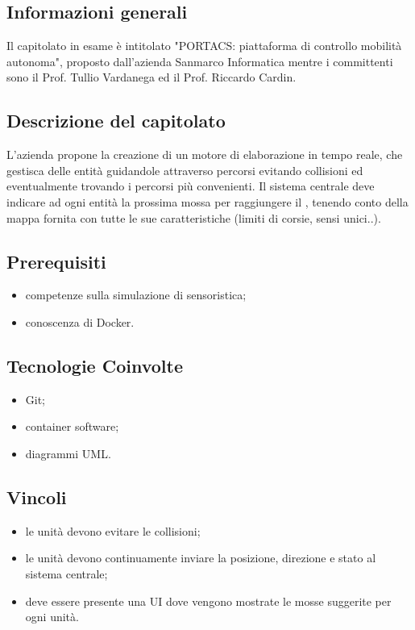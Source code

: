 \subsection{Informazioni generali}
Il capitolato in esame è intitolato "PORTACS: piattaforma di controllo mobilità autonoma", proposto dall'azienda Sanmarco Informatica mentre i committenti sono il Prof. Tullio Vardanega ed il Prof. Riccardo Cardin.
\subsection{Descrizione del capitolato}
L'azienda propone la creazione di un motore di elaborazione in tempo reale, che gestisca delle entità guidandole attraverso percorsi evitando collisioni ed eventualmente trovando i percorsi più convenienti.
Il sistema centrale deve indicare ad ogni entità la prossima mossa per raggiungere il , tenendo conto della mappa fornita con tutte le sue caratteristiche (limiti di corsie, sensi unici..).
\subsection{Prerequisiti}
\begin{itemize}
    \item competenze sulla simulazione di sensoristica;
    \item conoscenza di Docker.
\end{itemize}
\subsection{Tecnologie Coinvolte}
\begin{itemize}
    \item Git;
    \item container software;
    \item diagrammi UML.
\end{itemize}
\subsection{Vincoli}
\begin{itemize}
    \item le unità devono evitare le collisioni;
    \item le unità devono continuamente inviare la posizione, direzione e stato al sistema centrale;
    \item deve essere presente una UI dove vengono mostrate le mosse suggerite per ogni unità.
\end{itemize}
